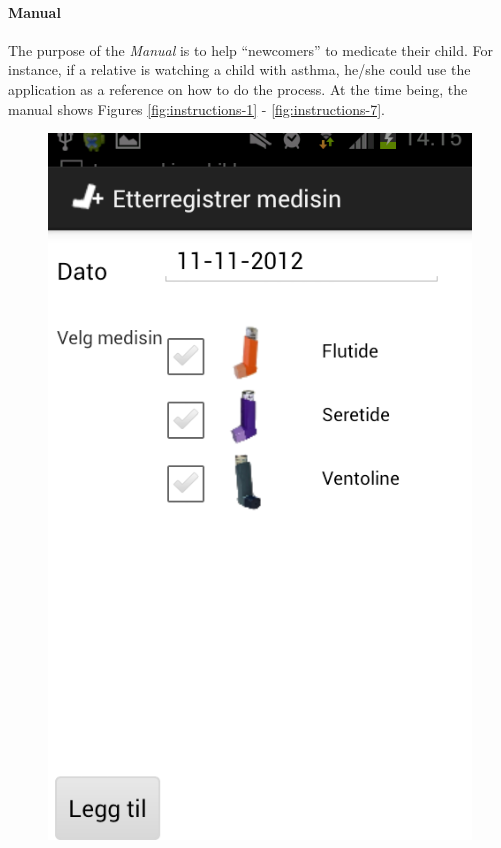 \paragraph{Manual}
The purpose of the \emph{Manual} is to help ``newcomers'' to medicate their child. For instance, if a relative is watching a child with asthma, he/she could use the application as a reference on how to do the process. At the time being, the manual shows Figures \ref{fig:instructions-1} - \ref{fig:instructions-7}. 
        
\begin{figure}[H]
	\begin{minipage}[b]{0.3\linewidth}
		\centering
		\includegraphics[width=0.20\paperwidth]{Pictures/app-screenshots/register_treatment_old.png}

\end{minipage}
\end{figure}
